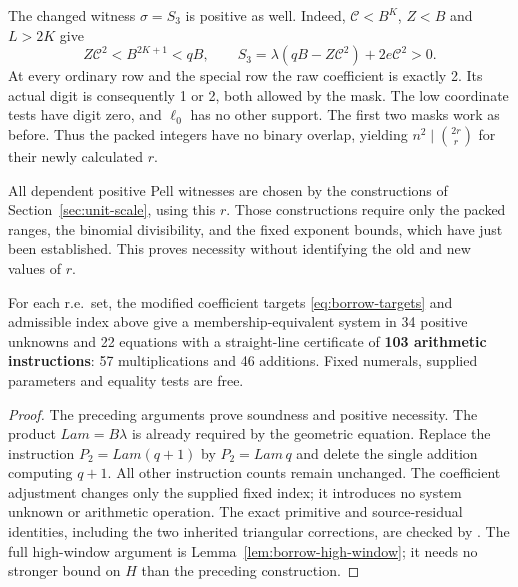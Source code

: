 The changed witness $\sigma=S_3$ is positive as well. Indeed,
$\mathcal C<B^K$, $Z<B$ and $L>2K$ give
\[
 Z\mathcal C^2<B^{2K+1}<qB,
 \qquad
 S_3=\lambda(qB-Z\mathcal C^2)+2e\mathcal C^2>0.
\]
At every ordinary row and the special row the raw coefficient is
exactly 2. Its actual digit is consequently 1 or 2, both allowed by
the mask. The low coordinate tests have digit zero, and $\ell_0$ has
no other support. The first two masks work as before. Thus the
packed integers have no binary overlap, yielding
$n^2\mid\binom{2r}{r}$ for their newly calculated $r$.

All dependent positive Pell witnesses are chosen by the constructions
of Section~\ref{sec:unit-scale}, using this $r$. Those constructions
require only the packed ranges, the binomial divisibility, and the
fixed exponent bounds, which have just been established. This proves
necessity without identifying the old and new values of $r$.

\begin{theorem}\label{thm:best103}
For each r.e.\ set, the modified coefficient targets
\eqref{eq:borrow-targets} and admissible index above give a
membership-equivalent system in 34 positive unknowns and 22 equations
with a straight-line certificate of \textbf{103 arithmetic instructions}:
57 multiplications and 46 additions. Fixed numerals, supplied parameters
and equality tests are free.
\end{theorem}
\begin{proof}
The preceding arguments prove soundness and positive necessity.
The product $\mathit{Lam}=B\lambda$ is already required by the
geometric equation. Replace the instruction
$P_2=\mathit{Lam}(q+1)$ by $P_2=\mathit{Lam}\,q$ and delete the
single addition computing $q+1$. All other instruction counts remain
unchanged. The coefficient adjustment changes only the supplied fixed
index; it introduces no system unknown or arithmetic operation.
The exact primitive and source-residual identities, including the two
inherited triangular corrections, are checked by
.
The full high-window argument is Lemma~\ref{lem:borrow-high-window};
it needs no stronger bound on $H$ than the preceding construction.
\end{proof}
